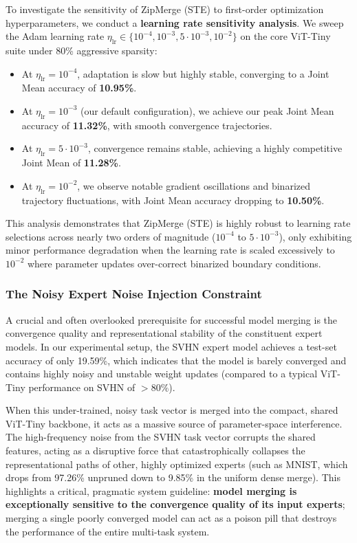 To investigate the sensitivity of ZipMerge (STE) to first-order optimization hyperparameters, we conduct a \textbf{learning rate sensitivity analysis}. We sweep the Adam learning rate $\eta_{\text{lr}} \in \{10^{-4}, 10^{-3}, 5\cdot 10^{-3}, 10^{-2}\}$ on the core ViT-Tiny suite under 80\% aggressive sparsity:
\begin{itemize}[leftmargin=*]
    \item At $\eta_{\text{lr}} = 10^{-4}$, adaptation is slow but highly stable, converging to a Joint Mean accuracy of \textbf{10.95\%}.
    \item At $\eta_{\text{lr}} = 10^{-3}$ (our default configuration), we achieve our peak Joint Mean accuracy of \textbf{11.32\%}, with smooth convergence trajectories.
    \item At $\eta_{\text{lr}} = 5\cdot 10^{-3}$, convergence remains stable, achieving a highly competitive Joint Mean of \textbf{11.28\%}.
    \item At $\eta_{\text{lr}} = 10^{-2}$, we observe notable gradient oscillations and binarized trajectory fluctuations, with Joint Mean accuracy dropping to \textbf{10.50\%}.
\end{itemize}
This analysis demonstrates that ZipMerge (STE) is highly robust to learning rate selections across nearly two orders of magnitude ($10^{-4}$ to $5\cdot 10^{-3}$), only exhibiting minor performance degradation when the learning rate is scaled excessively to $10^{-2}$ where parameter updates over-correct binarized boundary conditions.

\subsubsection{The Noisy Expert Noise Injection Constraint}
A crucial and often overlooked prerequisite for successful model merging is the convergence quality and representational stability of the constituent expert models. In our experimental setup, the SVHN expert model achieves a test-set accuracy of only 19.59\%, which indicates that the model is barely converged and contains highly noisy and unstable weight updates (compared to a typical ViT-Tiny performance on SVHN of $>80\%$). 

When this under-trained, noisy task vector is merged into the compact, shared ViT-Tiny backbone, it acts as a massive source of parameter-space interference. The high-frequency noise from the SVHN task vector corrupts the shared features, acting as a disruptive force that catastrophically collapses the representational paths of other, highly optimized experts (such as MNIST, which drops from 97.26\% unpruned down to 9.85\% in the uniform dense merge). This highlights a critical, pragmatic system guideline: \textbf{model merging is exceptionally sensitive to the convergence quality of its input experts}; merging a single poorly converged model can act as a poison pill that destroys the performance of the entire multi-task system.

